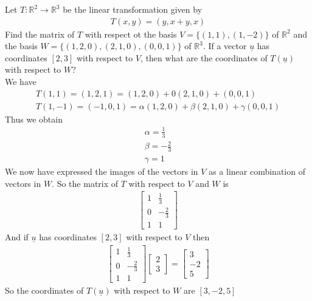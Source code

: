 \documentclass[a4paper]{article}
\theoremstyle{plain}
\theoremstyle{definition}
\newtheorem{exmp}{Example}[section]
\theoremstyle{remark}
\begin{document}
\begin{tcolorbox}[colback=black!3!white,colframe=black!60!white,title=\begin{exmp}Example 1 \label{Example 1}\end{exmp}]
        Let $T: \mathbb{R}^2 \to  \mathbb{R}^3$ be the linear transformation given by
                \begin{align}
                T(x,y) = (y,x+y,x)
                \end{align}
	Find the matrix of $T$ with respect ot the basis $V = \{(1,1),(1,-2)\}$ of $\mathbb{R}^2$ and the basis $W = \{ (1,2,0),(2,1,0),(0,0,1)\}$ of $\mathbb{R}^3$. If a vector $\underline{u}$ has coordinates $[2,3]$ with respect to $V$, then what are the coordinates of $T(\underline{u})$ with respect to $W$? \\
	We have
	\begin{align*}
		T(1,1) = (1,2,1) = (1,2,0) + 0(2,1,0) + (0,0,1) \\
		T(1,-1) = (-1,0,1) = \alpha(1,2,0) + \beta(2,1,0) + \gamma (0,0,1)
	\end{align*}
	Thus we obtain
	\begin{align*}
		\alpha = \frac{1}{3}\\
		\beta = -\frac{2}{3}\\
		\gamma = 1
	\end{align*}
	We now have expressed the images of the vectors in $V$ as a linear combination of vectors in $W$. So the matrix of $T$ with respect to $V$ and $W$ is
	\begin{align*}
		\begin{bmatrix} 1 & \frac{1}{3} \\ 0 & - \frac{2}{3} \\ 1 & 1 \end{bmatrix} 
	\end{align*}
And if $\underline{u}$ has coordinates $[2,3]$ with respect to $V$ then
\begin{align*}
	\begin{bmatrix} 1 & \frac{1}{3}\\ 0 & - \frac{2}{3} \\ 1 & 1 \end{bmatrix} \begin{bmatrix} 2 \\ 3 \end{bmatrix} = \begin{bmatrix} 3 \\ -2 \\ 5 \end{bmatrix} 
\end{align*}
So the coordinates of $T(\underline{u})$ with respect to $W$ are $[3,-2,5]$
\end{tcolorbox}
\end{document}
